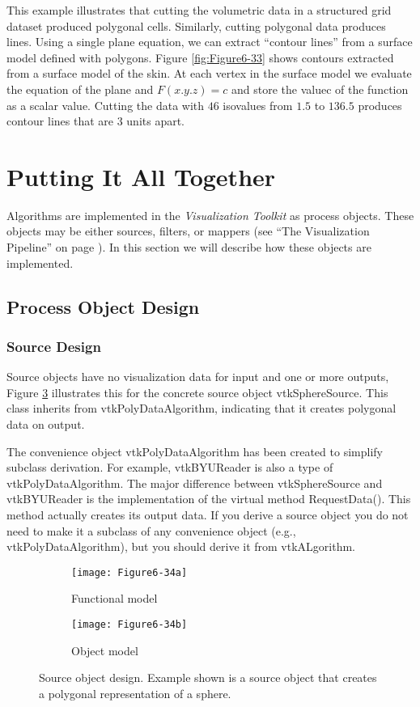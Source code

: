 This example illustrates that cutting the volumetric data in a structured grid dataset produced polygonal cells. Similarly, cutting polygonal data produces lines. Using a single plane equation, we can extract ``contour lines'' from a surface model defined with polygons. Figure \ref{fig:Figure6-33} shows contours extracted from a surface model of the skin. At each vertex in the surface model we evaluate the equation of the plane and $F(x.y.z) = c$ and store the valuec of the function as a scalar value. Cutting the data with $46$ isovalues from $1.5$ to $136.5$ produces contour lines that are $3$ units apart.

\section{Putting It All Together}

Algorithms are implemented in the \emph{Visualization Toolkit} as process objects. These objects may be either sources, filters, or mappers (see ``The Visualization Pipeline'' on page \pageref{sec:visualization_pipeline} ). In this section we will describe how these objects are implemented.

\subsection{Process Object Design}

\subsubsection{Source Design}
Source objects have no visualization data for input and one or more outputs, Figure \ref{fig:Figure6-34} illustrates this for the concrete source object vtkSphereSource. This class inherits from vtkPolyDataAlgorithm, indicating that it creates polygonal data on output.

The convenience object vtkPolyDataAlgorithm has been created to simplify subclass derivation. For example, vtkBYUReader is also a type of vtkPolyDataAlgorithm. The major difference between vtkSphereSource and vtkBYUReader is the implementation of the virtual method RequestData(). This method actually creates its output data. If you derive a source object you do not need to make it a subclass of any convenience object (e.g., vtkPolyDataAlgorithm), but you should derive it from vtkALgorithm.

\begin{figure}[htb]
	\begin{subfigure}[h]{0.48\linewidth}
		\texttt{[image: Figure6-34a]}
		\caption{Functional model}
		\label{fig:Figure6-34a}
	\end{subfigure}
	\hfill
	\begin{subfigure}[h]{0.48\linewidth}
		\texttt{[image: Figure6-34b]}
		\caption{Object model}
		\label{fig:Figure6-34b}
	\end{subfigure}
	\caption{Source object design. Example shown is a source object that creates a polygonal representation of a sphere.}\label{fig:Figure6-34}
\end{figure}

